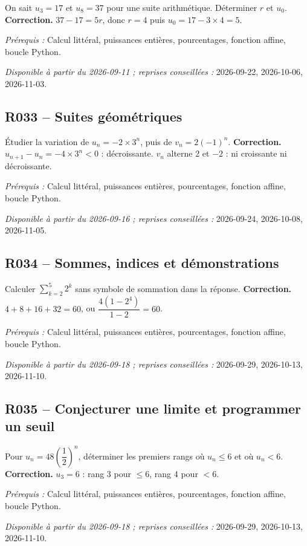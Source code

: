 On sait $u_3=17$ et $u_8=37$ pour une suite arithmétique. Déterminer $r$ et $u_0$.
\ifprof\textbf{Correction.} $37-17=5r$, donc $r=4$ puis $u_0=17-3\times4=5$.\par\textit{Prérequis :} Calcul littéral, puissances entières, pourcentages, fonction affine, boucle Python.\par\textit{Disponible à partir du 2026-09-11 ; reprises conseillées :} 2026-09-22, 2026-10-06, 2026-11-03.\fi
{}\subsection*{R033 -- Suites géométriques}\label{R033}
Étudier la variation de $u_n=-2\times3^n$, puis de $v_n=2(-1)^n$.
\ifprof\textbf{Correction.} $u_{n+1}-u_n=-4\times3^n<0$ : décroissante. $v_n$ alterne 2 et $-2$ : ni croissante ni décroissante.\par\textit{Prérequis :} Calcul littéral, puissances entières, pourcentages, fonction affine, boucle Python.\par\textit{Disponible à partir du 2026-09-16 ; reprises conseillées :} 2026-09-24, 2026-10-08, 2026-11-05.\fi
{}\subsection*{R034 -- Sommes, indices et démonstrations}\label{R034}
Calculer $\sum_{k=2}^{5}2^k$ sans symbole de sommation dans la réponse.
\ifprof\textbf{Correction.} $4+8+16+32=60$, ou $\dfrac{4(1-2^4)}{1-2}=60$.\par\textit{Prérequis :} Calcul littéral, puissances entières, pourcentages, fonction affine, boucle Python.\par\textit{Disponible à partir du 2026-09-18 ; reprises conseillées :} 2026-09-29, 2026-10-13, 2026-11-10.\fi
{}\subsection*{R035 -- Conjecturer une limite et programmer un seuil}\label{R035}
Pour $u_n=48(\dfrac{1}{2})^n$, déterminer les premiers rangs où $u_n\leq6$ et où $u_n<6$.
\ifprof\textbf{Correction.} $u_3=6$ : rang 3 pour $\leq6$, rang 4 pour $<6$.\par\textit{Prérequis :} Calcul littéral, puissances entières, pourcentages, fonction affine, boucle Python.\par\textit{Disponible à partir du 2026-09-18 ; reprises conseillées :} 2026-09-29, 2026-10-13, 2026-11-10.\fi
